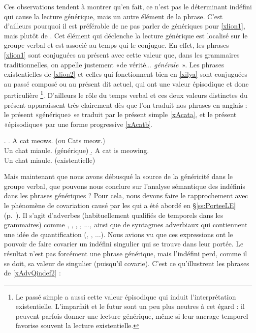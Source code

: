 Ces observations tendent à montrer qu'en fait, ce n'est pas le
déterminant indéfini qui cause la lecture générique, mais un autre
élément de la phrase.  C'est d'ailleurs pourquoi il est préférable de
ne pas parler de {\GN} génériques pour \ref{xlion1}, mais plutôt de
.  Cet
élément qui déclenche la lecture générique est localisé sur le groupe
verbal et est associé au temps qui le conjugue.  En effet, les phrases
\ref{xlion1} sont conjuguées au présent avec cette valeur que, dans
les grammaires traditionnelles, on appelle justement «de
vérité... \emph{générale}~». Les phrases existentielles de \ref{xlion2}
et celles qui fonctionnent bien en \ref{xilya} sont conjuguées au
passé composé ou au présent dit actuel, qui ont une valeur épisodique
et donc particulière%
\footnote{Le passé simple a aussi cette valeur
  épisodique qui induit l'interprétation existentielle. L'imparfait et
le futur sont un peu plus neutres à cet égard : il peuvent parfois
donner une lecture générique, même si leur ancrage temporel favorise
souvent la lecture existentielle.}.
D'ailleurs le rôle du temps verbal et ces deux valeurs distinctes
du présent apparaissent très 
clairement dès que l'on traduit nos phrases en anglais : le présent
«générique» se traduit par le présent simple \ref{xAcata}, et le
présent «épisodique» par une forme progressive \ref{xAcatb}.

\largerpage

\ex.
\a. A cat meows. (ou Cats meow.)\label{xAcata}\\ 
Un chat miaule. \qquad (générique)
\b. A cat is meowing.\label{xAcatb}\\ 
Un chat miaule. \qquad (existentielle)\


Mais maintenant que nous avons débusqué la source de la généricité
dans le groupe verbal, que pouvons nous conclure sur l'analyse
sémantique des {\GN} indéfinis dans les phrases génériques ?  Pour
cela, nous devons faire le rapprochement avec le phénomène de
covariation causé par les  qui a été abordé en
\S\ref{ss:PorteeLE} (p.~\pageref{AdvQ1l}).  Il s'agit d'adverbes
(habituellement qualifiés de temporels dans les grammaires) comme
, , , ,
..., ainsi que de syntagmes adverbiaux  qui contiennent
une idée de quantification (, , ...).
Nous avions vu que ces expressions ont le pouvoir de faire
covarier un indéfini singulier qui se trouve dans leur portée.
Le résultat n'est pas forcément une phrase
générique, mais l'indéfini perd, comme il se doit, sa valeur de
singulier (puisqu'il covarie).  C'est ce qu'illustrent les phrases de 
\ref{xAdvQindef2} :


